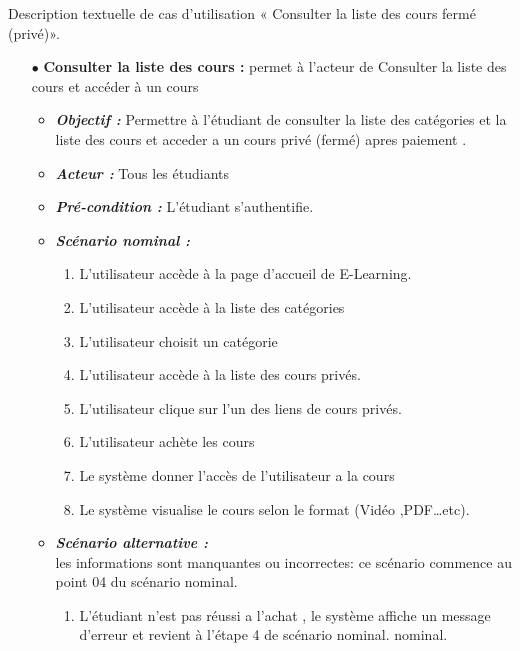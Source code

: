 Description textuelle de cas d’utilisation « Consulter la liste des cours fermé (privé)».


\begin{itemize}
	
	\item[$\bullet$] \textbf{Consulter la liste des cours :} permet à l’acteur de Consulter la liste des cours et
	 accéder à un cours
	\begin{itemize}
		\item \textit{\textbf{Objectif :}}  Permettre à l'étudiant de consulter la liste des catégories et la liste des cours et acceder a un cours privé (fermé) apres paiement . 
		
		\item \textit{\textbf{Acteur :}} Tous les étudiants
		
		\item \textit{\textbf{Pré-condition  :}}  L'étudiant s’authentifie.

		\item \textit{\textbf{Scénario nominal :}}
		\begin{enumerate}
			\item L’utilisateur accède à la page d’accueil de E-Learning.
\item L'utilisateur accède à la liste des catégories
\item L'utilisateur choisit un catégorie
\item L'utilisateur accède à la liste des cours privés.
\item L’utilisateur clique sur l’un des liens de cours privés.
\item L'utilisateur achète les cours
\item Le système donner l'accès de l'utilisateur  a la cours
\item Le système visualise le cours selon le format (Vidéo ,PDF…etc).
		\end{enumerate}
		\item \textit{\textbf{Scénario alternative :}} \\
		les informations sont manquantes ou incorrectes: ce scénario commence au point 04 du
		scénario nominal.
		\begin{enumerate}
			
			\item L'étudiant n'est pas réussi a l'achat , le système affiche un
			message d’erreur et revient à l’étape 4 de scénario nominal. nominal. 
		\end{enumerate}
	\end{itemize}
\end{itemize}	
\bigskip



